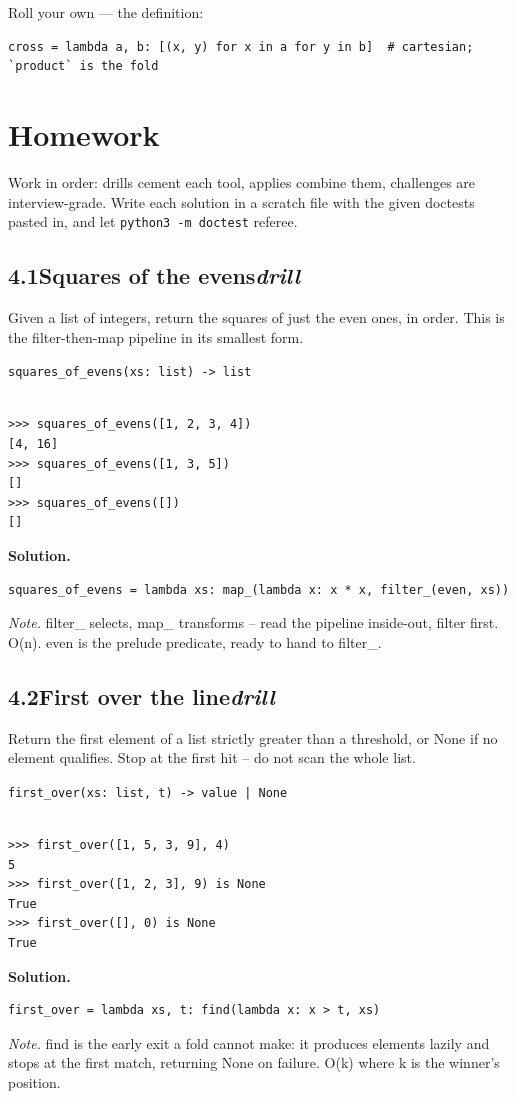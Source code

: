 \documentclass[10pt,letterpaper]{book}
\begin{document}
Roll your own --- the definition:

\begin{lstlisting}[style=ex]
cross = lambda a, b: [(x, y) for x in a for y in b]  # cartesian; `product` is the fold
\end{lstlisting}

\section{Homework}
Work in order: drills cement each tool, applies combine them,
challenges are interview-grade. Write each solution in a scratch file with
the given doctests pasted in, and let \texttt{python3 -m doctest} referee.
\subsection*{4.1\quad Squares of the evens\hfill\textnormal{\textit{drill}}}
Given a list of integers, return the squares of just the even ones, in order. This is the filter-then-map pipeline in its smallest form.

\noindent\texttt{squares\_of\_evens(xs: list) -> list}
\begin{lstlisting}[style=ex]

>>> squares_of_evens([1, 2, 3, 4])
[4, 16]
>>> squares_of_evens([1, 3, 5])
[]
>>> squares_of_evens([])
[]

\end{lstlisting}
\noindent\textbf{Solution.}
\begin{lstlisting}[style=code]
squares_of_evens = lambda xs: map_(lambda x: x * x, filter_(even, xs))
\end{lstlisting}
\noindent\textit{Note.} filter\_ selects, map\_ transforms -- read the pipeline inside-out, filter first. O(n). even is the prelude predicate, ready to hand to filter\_.

\subsection*{4.2\quad First over the line\hfill\textnormal{\textit{drill}}}
Return the first element of a list strictly greater than a threshold, or None if no element qualifies. Stop at the first hit -- do not scan the whole list.

\noindent\texttt{first\_over(xs: list, t) -> value | None}
\begin{lstlisting}[style=ex]

>>> first_over([1, 5, 3, 9], 4)
5
>>> first_over([1, 2, 3], 9) is None
True
>>> first_over([], 0) is None
True

\end{lstlisting}
\noindent\textbf{Solution.}
\begin{lstlisting}[style=code]
first_over = lambda xs, t: find(lambda x: x > t, xs)
\end{lstlisting}
\noindent\textit{Note.} find is the early exit a fold cannot make: it produces elements lazily and stops at the first match, returning None on failure. O(k) where k is the winner's position.
\end{document}
